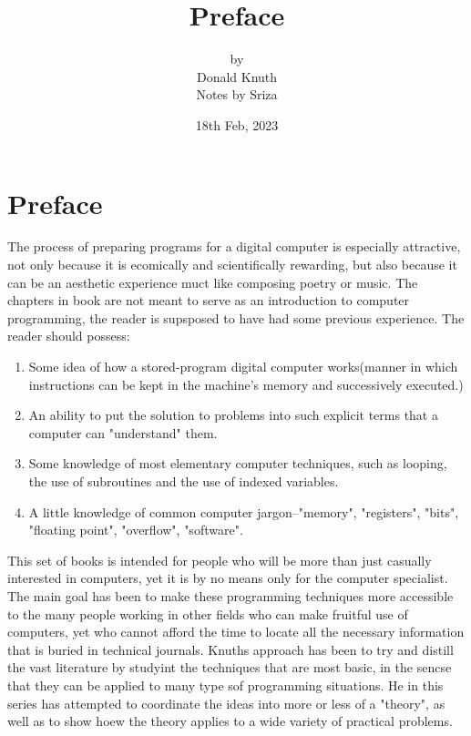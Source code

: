 \documentclass{article}
\title{Preface}
\author{by\\Donald Knuth \vspace{0.5in} \\Notes by Sriza}
\date{18th Feb, 2023}
\begin{document}
\maketitle
\thispagestyle{empty}
\newpage

\tableofcontents
\thispagestyle{empty}
\newpage

\section{Preface}
\setcounter{page}{1}
The process of preparing programs for a digital computer is especially attractive, not only because it is ecomically and scientifically rewarding, but also because it can be an aesthetic experience muct like composing poetry or music. The chapters in book are not meant to serve as an introduction to computer programming, the reader is supsposed to have had some previous experience. The reader should possess:
\begin{enumerate}
    \item Some idea of how a stored-program digital computer works(manner in which instructions can be kept in the machine's memory and successively executed.)
    \item An ability to put the solution to problems into such explicit terms that a computer can "understand" them.
    \item Some knowledge of most elementary computer techniques, such as looping, the use of subroutines and the use of indexed variables.
    \item A little knowledge of common computer jargon--"memory", "registers", "bits", "floating point", "overflow", "software".
\end{enumerate}

This set of books is intended for people who will be more than just casually interested in computers, yet it is by no means only for the computer specialist. The main goal has been to make these programming techniques more accessible to the many people working in other fields who can make fruitful use of computers, yet who cannot afford the time to locate all the necessary information that is buried in technical journals. Knuths approach has been to try and distill the vast literature by studyint the techniques that are most basic, in the sencse that they can be applied to many type sof programming situations. He in this series has attempted to coordinate the ideas into more or less of a "theory", as well as to show hoew the theory applies to a wide variety of practical problems.
\end{document}
